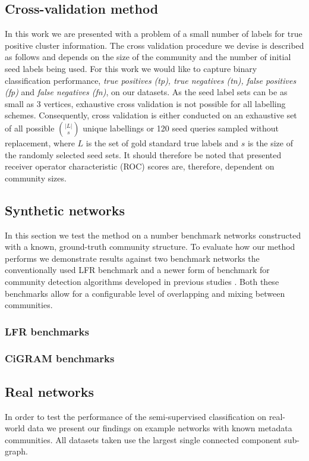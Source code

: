 \documentclass[a4paper,10pt]{article}
\begin{document}
\subsection{Cross-validation method}
\label{sec:cross_validation}
In this work we are presented with a problem of a small number of labels for true positive cluster information.
The cross validation procedure we devise is described as follows and depends on the size of the community and the number of initial seed labels being used.
For this work we would like to capture binary classification  performance, \textit{true positives (tp), true negatives (tn), false positives (fp)} and \textit{false negatives (fn)}, on our datasets.
As the seed label sets can be as small as 3 vertices, exhaustive cross validation is not possible for all labelling schemes.
Consequently, cross validation is either conducted on an exhaustive set of all possible $\binom{|L|}{s}$ unique labellings or 120 seed queries sampled without replacement, where $L$ is the set of gold standard true labels and $s$ is the size of the randomly selected seed sets.
It should therefore be noted that presented receiver operator characteristic (ROC) scores are, therefore, dependent on community sizes.

\subsection{Synthetic networks}
In this section we test the method on a number benchmark networks constructed with a known, ground-truth community structure.
To evaluate how our method performs we demonstrate results against two benchmark networks the conventionally used LFR benchmark \cite{lfr} and a newer form of benchmark for community detection algorithms developed in previous studies \cite{cigram}.
Both these benchmarks allow for a configurable level of overlapping and mixing between communities.

\subsubsection{LFR benchmarks}

\subsubsection{CiGRAM benchmarks}

\subsection{Real networks}
In order to test the performance of the semi-supervised classification on real-world data we present our findings on example networks with known metadata communities.
All datasets taken use the largest single connected component sub-graph.
\end{document}
